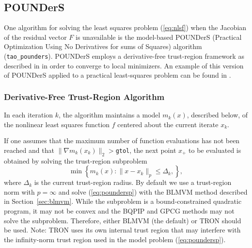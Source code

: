 \documentclass[]{book}
\begin{document}
\subsection{POUNDerS}\label{sec:pounders}
One algorithm for solving the least squares problem (\ref{eq:nlsf}) when
the Jacobian of the residual vector $F$ is unavailable is the model-based
POUNDerS (Practical Optimization Using No Derivatives for
sums of Squares) algorithm (\texttt{tao\_pounders}). 
POUNDerS employs a derivative-free trust-region framework as described in
\cite{Dfobook} in order to converge to local minimizers. An example of
this version of POUNDerS applied to a
practical least-squares problem can be found in \cite{UNEDF0}.

\subsubsection{Derivative-Free Trust-Region Algorithm}
In each iteration $k$, the algorithm maintains a model $m_k(x)$,
described below, of the nonlinear least squares function $f$ centered about
the current iterate $x_k$. 

If one assumes that the maximum number of function evaluations has not been
reached and that $\|\nabla m_k(x_k)\|_2>$\texttt{gtol}, the next point 
$x_+$ to be evaluated is obtained by solving the trust-region subproblem 
\begin{equation}
 \min\left\{
 m_k(x) : 
 \|x-x_k\|_{p} \leq \Delta_k, 
 \right \}, 
 \label{eq:poundersp}
\end{equation}
where $\Delta_k$ is the current 
trust-region radius. By default we use a trust-region norm with $p=\infty$
and solve (\ref{eq:poundersp}) with the BLMVM method described in
Section~\ref{sec:blmvm}.  While the subproblem is a bound-constrained
quadratic program, it may not be convex and the BQPIP and GPCG methods 
may not solve the subproblem.  Therefore, either BLMVM (the default) 
or TRON should be used.  Note: TRON uses its own internal trust region 
that may interfere with the infinity-norm trust region used in the 
model problem (\ref{eq:poundersp}).
\end{document}
